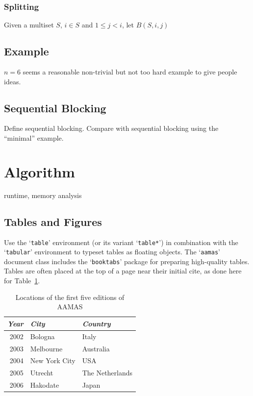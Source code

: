 \documentclass[sigconf,anonymous]{aamas}
\newcommand{\ykc}[1]{{\color{blue} #1}}
\begin{document}
\subsubsection{Splitting}

Given a multiset $S$, $i \in S$ and $1 \leq j < i$, let $B(S, i, j)$ 

\subsection{Example}

\ykc{$n=6$ seems a reasonable non-trivial but not too hard example to give people ideas.}

\subsection{Sequential Blocking}

\ykc{Define sequential blocking. Compare with sequential blocking using the ``minimal'' example.}

\section{Algorithm}

\ykc{runtime, memory analysis}

\subsection{Tables and Figures}

Use the `\texttt{table}' environment (or its variant `\texttt{table*}')
in combination with the `\texttt{tabular}' environment to typeset tables
as floating objects. The `\texttt{aamas}' document class includes the 
`\texttt{booktabs}' package for preparing high-quality tables. Tables 
are often placed at the top of a page near their initial cite, as done 
here for Table~\ref{tab:locations}.

\begin{table}[t]
	\caption{Locations of the first five editions of AAMAS}
	\label{tab:locations}
	\begin{tabular}{rll}\toprule
		\textit{Year} & \textit{City} & \textit{Country} \\ \midrule
		2002 & Bologna & Italy \\
		2003 & Melbourne & Australia \\
		2004 & New York City & USA \\
		2005 & Utrecht & The Netherlands \\
		2006 & Hakodate & Japan \\ \bottomrule
	\end{tabular}
\end{table}
\end{document}
